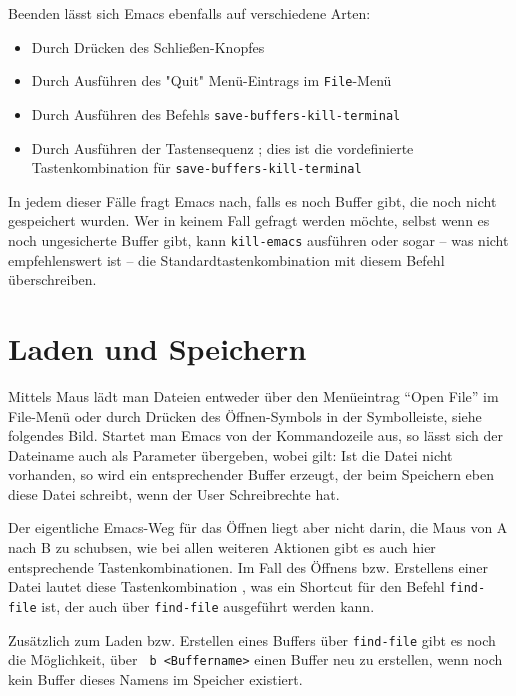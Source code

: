 \documentclass[12pt,ngerman]{scrbook}
\begin{document}
Beenden lässt sich Emacs ebenfalls auf verschiedene Arten:

\begin{itemize}
	\item Durch Drücken des Schließen-Knopfes
	\item Durch Ausführen des "Quit" Menü-Eintrags im \texttt{File}-Menü
	\item Durch Ausführen des Befehls   \texttt{save-buffers-kill-terminal}
	\item Durch Ausführen der Tastensequenz  ; dies ist die vordefinierte Tastenkombination für  \texttt{save-buffers-kill-terminal}

\end{itemize}

In jedem dieser Fälle fragt Emacs nach, falls es noch Buffer gibt, die noch nicht gespeichert wurden. 
Wer in keinem Fall gefragt werden möchte, selbst wenn es noch ungesicherte Buffer gibt, kann  \texttt{kill-emacs} ausführen oder sogar -- was nicht empfehlenswert ist -- die Standardtastenkombination   mit diesem Befehl überschreiben.

\section{Laden und Speichern}

Mittels Maus lädt man Dateien entweder über den Menüeintrag \enquote{Open File} im File-Menü oder durch Drücken des Öffnen-Symbols in der Symbolleiste, siehe folgendes Bild. Startet man Emacs von der Kommandozeile aus, so lässt sich der Dateiname auch als Parameter übergeben, wobei gilt: Ist die Datei nicht vorhanden, so wird ein entsprechender Buffer erzeugt, der beim Speichern eben diese Datei schreibt, wenn der User Schreibrechte hat.

Der eigentliche Emacs-Weg für das Öffnen liegt aber nicht darin, die Maus von A nach B zu schubsen, wie bei allen weiteren Aktionen gibt es auch hier entsprechende Tastenkombinationen. Im Fall des Öffnens bzw. Erstellens einer Datei lautet diese Tastenkombination  , was ein Shortcut für den Befehl \texttt{find-file} ist, der auch über  \texttt{find-file} ausgeführt werden kann.

Zusätzlich zum Laden bzw. Erstellen eines Buffers über \texttt{find-file} gibt es noch die Möglichkeit, über  \texttt{~b <Buffername>} einen Buffer neu zu erstellen, wenn noch kein Buffer dieses Namens im Speicher existiert.
\end{document}

